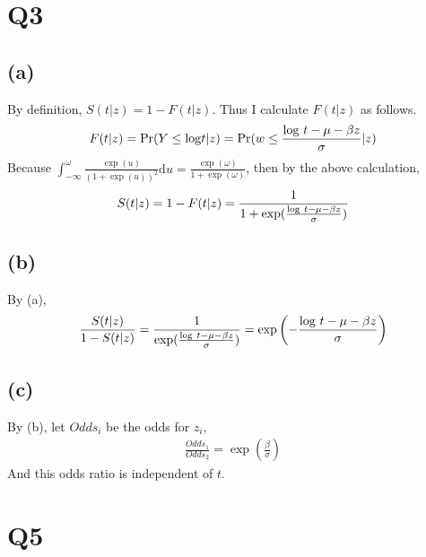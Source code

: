 \documentclass{article}
\begin{document}
\section{Q3}
\subsection{(a)}
By definition, $S(t|z) = 1 - F(t|z)$. Thus I calculate $F(t|z)$ as follows.
\begin{align*}
	F(t|z) = {\rm Pr}(Y \leq {\rm log}t |z) = {\rm Pr}(w \leq \frac{{\rm log}\ t - \mu- \beta z}{\sigma} |z)
\end{align*}
Because $\int_{-\infty}^{\omega} \frac{\exp(u)}{(1 + \exp(u))^2} \mathrm{d}u = \frac{\exp(\omega)}{1 + \exp(\omega)}$, then by the above calculation,
\begin{align*}
	S(t|z) = 1- F(t|z) = \frac{1}{1 + \exp(\frac{{\rm log}\ t - \mu- \beta z}{\sigma})}
\end{align*}

\subsection{(b)}
By (a),
\begin{align*}
	\frac{S(t|z)}{1 - S(t|z)} = \frac{1}{\exp(\frac{{\rm log}\ t - \mu- \beta z}{\sigma})} = \exp \left(- \frac{{\rm log}\ t - \mu- \beta z}{\sigma} \right)
\end{align*}

\subsection{(c)}
By (b), let $Odds_i$ be the odds for $z_i$,
\begin{align*}
	\frac{Odds_1}{Odds_2} = \exp \left(\frac{\beta}{\sigma} \right)
\end{align*}
And this odds ratio is independent of $t$.

\section{Q5}
\end{document}

